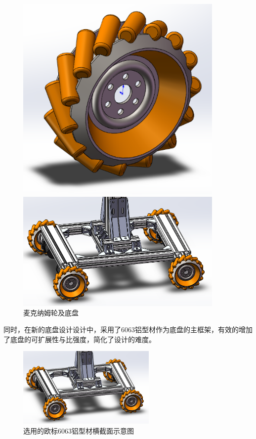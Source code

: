 \begin{figure}[ht]
\begin{minipage}[t]{0.35\textwidth}
    \centering
    \includegraphics[width = 0.9\textwidth]{images/chassis_1.png}
\end{minipage}
\begin{minipage}[t]{0.65\textwidth}
    \centering
    \includegraphics[width = 0.9\textwidth]{images/chassis_2.png}
\end{minipage}
\caption{麦克纳姆轮及底盘}
\label{fig:cha1}
\end{figure}

同时，在新的底盘设计设计中，采用了6063铝型材作为底盘的主框架，有效的增加了底盘的可扩展性与比强度，简化了设计的难度。

\begin{figure}[H]
    \centering
    \includegraphics[width = 0.6\textwidth]{images/chassis_2.png}
    \caption{选用的欧标6063铝型材横截面示意图}
    \label{fig:cha2}
\end{figure}
